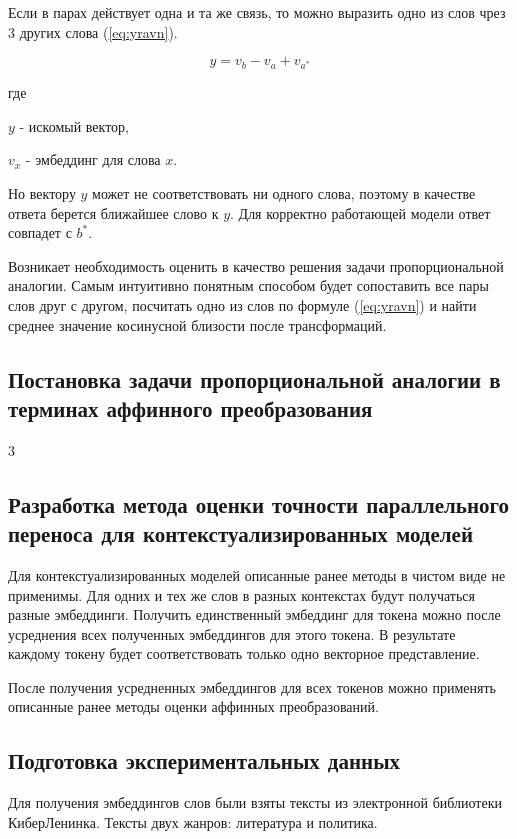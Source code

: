 \documentclass[a4paper,14pt]{article}
\begin{document}
	Если в парах действует одна и та же связь, то можно выразить одно из слов чрез 3 других слова (\ref{eq:yravn}).
	
	\begin{equation}
		y = v_b - v_a + v_{a^*}
		\label{eq:yravn}
	\end{equation}
	 
	 где 
	 
	 $y$ - искомый вектор,
	 
	 $v_x$ - эмбеддинг для слова $x$.
	 
	 Но вектору $y$ может не соответствовать ни одного слова, поэтому в качестве ответа берется ближайшее слово к $y$.
	 Для корректно работающей модели ответ совпадет с $b^*$.
	 

	Возникает необходимость оценить в качество решения задачи пропорциональной аналогии.
	Самым интуитивно понятным способом будет сопоставить все пары слов друг с другом, посчитать одно из слов по формуле (\ref{eq:yravn}) и найти среднее значение косинусной близости после трансформаций.
	
	\subsection{Постановка задачи пропорциональной аналогии в терминах аффинного преобразования}
	3
	
	\subsection{Разработка метода оценки точности параллельного переноса для контекстуализированных моделей}
	
	Для контекстуализированных моделей описанные ранее методы в чистом виде не применимы.
	Для одних и тех же слов в разных контекстах будут получаться разные эмбеддинги.
	Получить единственный эмбеддинг для токена можно после усреднения всех полученных эмбеддингов для этого токена.
	В результате каждому токену будет соответствовать только одно векторное представление.
	
	После получения усредненных эмбеддингов для всех токенов можно применять описанные ранее методы оценки аффинных преобразований.
	
	\subsection{Подготовка экспериментальных данных}
	
	Для получения эмбеддингов слов были взяты тексты из электронной библиотеки КиберЛенинка.
	Тексты двух жанров: литература и политика.
	
\end{document}
